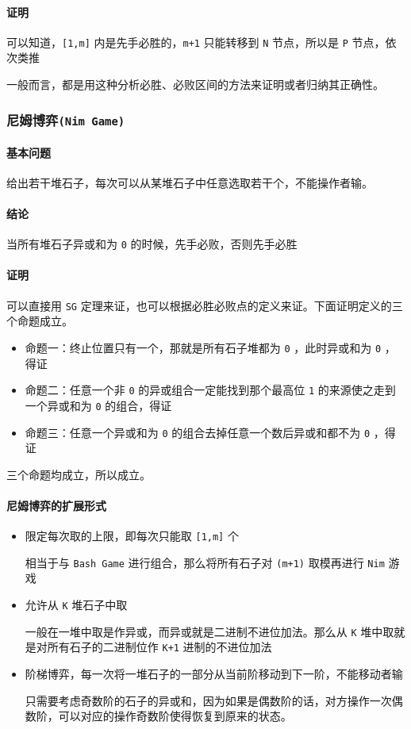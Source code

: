 \documentclass[UTF-8]{ctexart}
\begin{document}
	\paragraph{证明} 可以知道，\texttt{[1,m]} 内是先手必胜的，\texttt{m+1} 只能转移到 \texttt{N} 节点，所以是 \texttt{P} 节点，依次类推
	
	一般而言，都是用这种分析必胜、必败区间的方法来证明或者归纳其正确性。
	
	\subsubsection{尼姆博弈\texttt{(Nim Game)}}
	\paragraph{基本问题} 给出若干堆石子，每次可以从某堆石子中任意选取若干个，不能操作者输。
	\paragraph{结论} 当所有堆石子异或和为 \texttt{0} 的时候，先手必败，否则先手必胜
	\paragraph{证明} 可以直接用 \texttt{SG} 定理来证，也可以根据必胜必败点的定义来证。下面证明定义的三个命题成立。
	
	\begin{itemize}
		\item 命题一：终止位置只有一个，那就是所有石子堆都为 \texttt{0} ，此时异或和为 \texttt{0} ，得证  
		\item 命题二：任意一个非 \texttt{0} 的异或组合一定能找到那个最高位 \texttt{1} 的来源使之走到一个异或和为 \texttt{0} 的组合，得证  
		\item 命题三：任意一个异或和为 \texttt{0} 的组合去掉任意一个数后异或和都不为 \texttt{0} ，得证  
	\end{itemize}
	三个命题均成立，所以成立。
	
	\paragraph{尼姆博弈的扩展形式}
	\begin{itemize}
		\item 限定每次取的上限，即每次只能取 \texttt{[1,m]} 个
	
		相当于与 \texttt{Bash Game} 进行组合，那么将所有石子对 \texttt{(m+1)} 取模再进行 \texttt{Nim} 游戏
	
		\item 允许从 \texttt{K} 堆石子中取
	
		一般在一堆中取是作异或，而异或就是二进制不进位加法。那么从 \texttt{K} 堆中取就是对所有石子的二进制位作 \texttt{K+1} 进制的不进位加法
	
		\item 阶梯博弈，每一次将一堆石子的一部分从当前阶移动到下一阶，不能移动者输
	
		只需要考虑奇数阶的石子的异或和，因为如果是偶数阶的话，对方操作一次偶数阶，可以对应的操作奇数阶使得恢复到原来的状态。
	\end{itemize}
	
\end{document}
